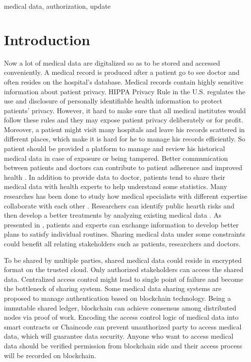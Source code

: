 \documentclass[conference]{IEEEtran}
\begin{document}
\begin{IEEEkeywords}
medical data, authorization, update
\end{IEEEkeywords}

\section{Introduction}

Now a lot of medical data are digitalized so as to be stored and accessed conveniently. A medical record is produced after a patient go to see doctor and often resides on the hospital's database. Medical records contain highly sensitive information about patient privacy. HIPPA Privacy Rule  \cite{centers2004hipaa} in the U.S. regulates the use and disclosure of personally identifiable health information to protect patients' privacy. However, it hard to make sure that all medical institutes would follow these rules and they may expose patient privacy deliberately or for profit. Moreover, a patient might visit many hospitals and leave his records scattered \cite{zhang2016secure} in different places, which make it is hard for he to manage his records efficiently. So patient should be provided a platform to manage and review his historical medical data in case of exposure or being tampered. Better communication between patients and doctors can contribute to patient adherence \cite{zolnierek2009physician} and  improved health \cite{street2009does}. In addition to provide data to doctor, patients tend to share their medical data with health experts to help understand some statistics. Many researches has been done to study how medical specialists with different expertise collaborate with each other \cite{fitzpatrick2013review}.  Researchers can identify public hearth risks and then develop a better treatments by analyzing existing medical data \cite{office2015report}. As presented in \cite{chung2018using},  patients and experts can exchange information to develop better plans to satisfy individual routines. Sharing medical data under some constraints could benefit all relating stakeholders such as patients, researchers and doctors. 

To be shared by multiple parties, shared medical data could reside in encrypted format on the trusted cloud. Only authorized stakeholders can access the shared data. Centralized access control might lead to single point of failure and become the bottleneck of sharing system. Some medical data sharing systems \cite{azaria2016medrec,fan2018medblock,xia2017bbds} are proposed to manage authentication based on blockchain\cite{nakamoto2008bitcoin} technology. Being a immutable shared ledger, blockchain can achieve consensus among distributed nodes via proof of work. Encoding the access control logic of medical data into smart contracts\cite{azaria2016medrec} or Chaincode \cite{dubovitskaya2017secure} can prevent unauthorized party to access medical data, which will guarantee data security. Anyone who want to access medical data should be verified permission from blockchain side and their access process will be recorded on blockchain.
\end{document}

